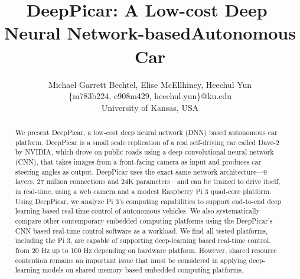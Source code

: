 \documentclass[10pt, conference]{IEEEtran}
\begin{document}
\title{DeepPicar:​ ​A​ ​Low-cost​ ​Deep​ ​Neural​ ​Network-based​ ​Autonomous​ ​Car}
\author{Michael Garrett Bechtel, Elise McEllhiney, Heechul Yun\\
\{m783b224, e908m429, heechul.yun\}@ku.edu\\
University of Kansas, USA\\ 
}

\maketitle
\thispagestyle{empty}
\begin{abstract}
We present DeepPicar, a low-cost deep neural network (DNN) based
autonomous car platform. DeepPicar is a small scale
replication of a real self-driving car called Dave-2 by NVIDIA, which
drove on public roads using a deep convolutional neural network (CNN), 
that takes images from a front-facing camera as input and produces
car steering angles as output. DeepPicar uses the exact same network
architecture---9 layers, 27 million connections and 24K
parameters---and can be trained to drive itself, in real-time, using a
web camera and a modest Raspberry Pi 3 quad-core platform.
Using DeepPicar, we analyze Pi 3's computing capabilities to 
support end-to-end deep learning based real-time control of autonomous
vehicles. We also systematically compare other contemporary embedded
computing platforms using the DeepPicar's CNN based real-time control
software as a workload. 
We find all tested platforms, including the Pi 3, are capable of
supporting deep-learning based real-time control, from 20 Hz up to 100
Hz depending on hardware platform. 
However, shared resource contention remains an
important issue that must be considered in applying deep-learning
models on shared memory based embedded computing platforms.

\end{abstract}






% 




\appendix

\end{document}
